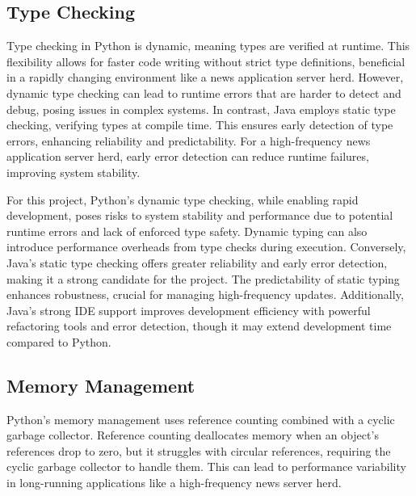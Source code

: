 \documentclass[letterpaper,twocolumn,10pt]{article}
\begin{document}
\subsection{Type Checking}
\noindent{}Type checking in Python is dynamic, meaning types are verified at runtime. This flexibility allows for faster code writing without strict type definitions, beneficial in a rapidly changing environment like a news application server herd. However, dynamic type checking can lead to runtime errors that are harder to detect and debug, posing issues in complex systems. In contrast, Java employs static type checking, verifying types at compile time. This ensures early detection of type errors, enhancing reliability and predictability. For a high-frequency news application server herd, early error detection can reduce runtime failures, improving system stability.
\vspace{5pt}

\noindent{}For this project, Python's dynamic type checking, while enabling rapid development, poses risks to system stability and performance due to potential runtime errors and lack of enforced type safety. Dynamic typing can also introduce performance overheads from type checks during execution. Conversely, Java’s static type checking offers greater reliability and early error detection, making it a strong candidate for the project. The predictability of static typing enhances robustness, crucial for managing high-frequency updates. Additionally, Java’s strong IDE support improves development efficiency with powerful refactoring tools and error detection, though it may extend development time compared to Python.
\subsection{Memory Management}
\noindent{}Python's memory management uses reference counting combined with a cyclic garbage collector. Reference counting deallocates memory when an object's references drop to zero, but it struggles with circular references, requiring the cyclic garbage collector to handle them. This can lead to performance variability in long-running applications like a high-frequency news server herd.
\vspace{5pt}
\end{document}

